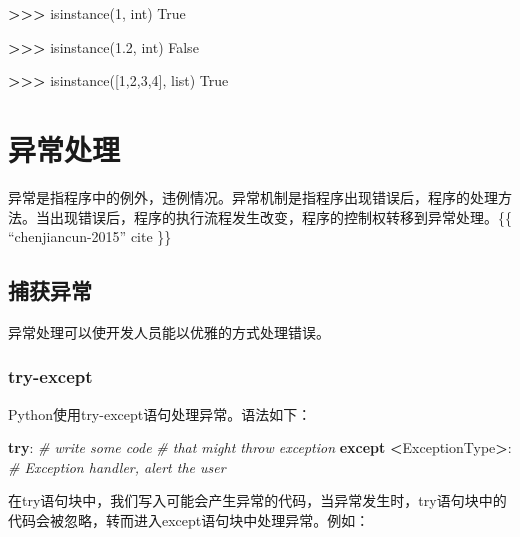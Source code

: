 \documentclass[]{ctexbook}
\newenvironment{Shaded}{\begin{snugshade}}{\end{snugshade}}
\newcommand{\BuiltInTok}[1]{#1}
\newcommand{\CommentTok}[1]{\textcolor[rgb]{0.56,0.35,0.01}{\textit{#1}}}
\newcommand{\ControlFlowTok}[1]{\textcolor[rgb]{0.13,0.29,0.53}{\textbf{#1}}}
\newcommand{\DecValTok}[1]{\textcolor[rgb]{0.00,0.00,0.81}{#1}}
\newcommand{\FloatTok}[1]{\textcolor[rgb]{0.00,0.00,0.81}{#1}}
\newcommand{\NormalTok}[1]{#1}
\newcommand{\OperatorTok}[1]{\textcolor[rgb]{0.81,0.36,0.00}{\textbf{#1}}}
\newcommand{\VariableTok}[1]{\textcolor[rgb]{0.00,0.00,0.00}{#1}}
\begin{document}
\begin{Shaded}
\begin{Highlighting}[]
\OperatorTok{>>>} \BuiltInTok{isinstance}\NormalTok{(}\DecValTok{1}\NormalTok{, }\BuiltInTok{int}\NormalTok{)}
\VariableTok{True}

\OperatorTok{>>>} \BuiltInTok{isinstance}\NormalTok{(}\FloatTok{1.2}\NormalTok{, }\BuiltInTok{int}\NormalTok{)}
\VariableTok{False}

\OperatorTok{>>>} \BuiltInTok{isinstance}\NormalTok{([}\DecValTok{1}\NormalTok{,}\DecValTok{2}\NormalTok{,}\DecValTok{3}\NormalTok{,}\DecValTok{4}\NormalTok{], }\BuiltInTok{list}\NormalTok{)}
\VariableTok{True}
\end{Highlighting}
\end{Shaded}

\hypertarget{exception}{%
\chapter{异常处理}\label{exception}}

异常是指程序中的例外，违例情况。异常机制是指程序出现错误后，程序的处理方法。当出现错误后，程序的执行流程发生改变，程序的控制权转移到异常处理。\{\{ ``chenjiancun-2015'' \textbar{} cite \}\}

\hypertarget{ux6355ux83b7ux5f02ux5e38}{%
\section{捕获异常}\label{ux6355ux83b7ux5f02ux5e38}}

异常处理可以使开发人员能以优雅的方式处理错误。

\hypertarget{try-except}{%
\subsection{try-except}\label{try-except}}

Python使用try-except语句处理异常。语法如下：

\begin{Shaded}
\begin{Highlighting}[]
\ControlFlowTok{try}\NormalTok{:}
    \CommentTok{# write some code}
    \CommentTok{# that might throw exception}
\ControlFlowTok{except} \OperatorTok{<}\NormalTok{ExceptionType}\OperatorTok{>}\NormalTok{:}
    \CommentTok{# Exception handler, alert the user}
\end{Highlighting}
\end{Shaded}

在try语句块中，我们写入可能会产生异常的代码，当异常发生时，try语句块中的代码会被忽略，转而进入except语句块中处理异常。例如：
\end{document}

